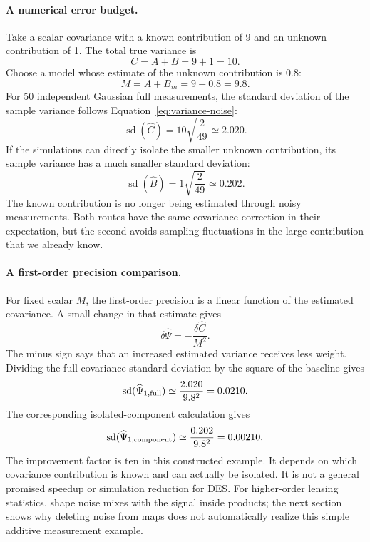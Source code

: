 \documentclass[11pt]{article}
\begin{document}
\paragraph{A numerical error budget.}
Take a scalar covariance with a known contribution of 9 and an unknown
contribution of 1. The total true variance is
\begin{equation}
 C=A+B=9+1=10.
\end{equation}
Choose a model whose estimate of the unknown contribution is 0.8:
\begin{equation}
 M=A+B_m=9+0.8=9.8.
\end{equation}
For 50 independent Gaussian full measurements, the standard deviation of
the sample variance follows Equation~\eqref{eq:variance-noise}:
\begin{equation}
 \operatorname{sd}(\widehat C)=10\sqrt{\frac2{49}}\simeq2.020.
\end{equation}
If the simulations can directly isolate the smaller unknown contribution,
its sample variance has a much smaller standard deviation:
\begin{equation}
 \operatorname{sd}(\widehat B)=1\sqrt{\frac2{49}}\simeq0.202.
\end{equation}
The known contribution is no longer being estimated through noisy
measurements. Both routes have the same covariance correction in their
expectation, but the second avoids sampling fluctuations in the large
contribution that we already know.

\paragraph{A first-order precision comparison.}
For fixed scalar $M$, the first-order precision is a linear function of
the estimated covariance. A small change in that estimate gives
\begin{equation}
 \delta\widehat\Psi=-\frac{\delta\widehat C}{M^2}.
\end{equation}
The minus sign says that an increased estimated variance receives less
weight. Dividing the full-covariance standard deviation by the square of the
baseline gives
\begin{equation}
 \operatorname{sd}(\widehat\Psi_{1,\rm full})
      \simeq\frac{2.020}{9.8^2}=0.0210.
\end{equation}
The corresponding isolated-component calculation gives
\begin{equation}
 \operatorname{sd}(\widehat\Psi_{1,\rm component})
      \simeq\frac{0.202}{9.8^2}=0.00210.
\end{equation} The improvement factor is ten in this
constructed example. It depends on which covariance contribution is
known and can actually be isolated. It is not a general promised speedup
or simulation reduction for DES. For higher-order lensing statistics,
shape noise mixes with the signal inside products; the next section
shows why deleting noise from maps does not automatically realize this
simple additive measurement example.
\end{document}
